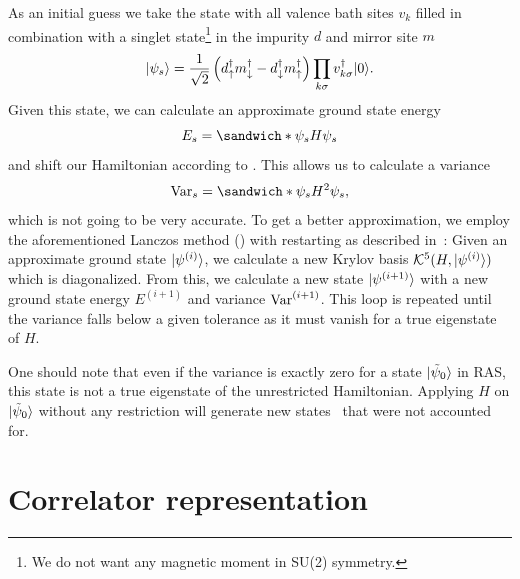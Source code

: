 As an initial guess we take the state with all valence bath sites $v_k$ filled in combination with
a singlet state\footnote{
    We do not want any magnetic moment in SU(2) symmetry. %
}
in the impurity $d$ and mirror site $m$
\begin{equation}
    \ket*{\psi_s}
    =
    \frac{1}{\sqrt{2}}
    \left(d^\dag_\uparrow m^\dag_\downarrow - d^\dag_\downarrow m^\dag_\uparrow\right)
    \prod_{k\sigma} v^\dag_{k\sigma}
    \ket{0}.
\end{equation}
Given this state, we can calculate an approximate ground state energy
\begin{equation}
    E_s = \sandwich*{\psi_s}{H}{\psi_s}
\end{equation}
and shift our Hamiltonian according to .
This allows us to calculate a variance
\begin{equation}
    \var_s
    =
    \sandwich*{\psi_s}{H^2}{\psi_s},
\end{equation}
which is not going to be very accurate.
To get a better approximation,
we employ the aforementioned Lanczos method () with restarting
as described in~\cite{Lu2014}:
Given an approximate ground state $\ket{\psi^{(i)}}$,
we calculate a new Krylov basis $\mathcal{K}^5(H, \ket{\psi^{(i)}})$ which is diagonalized.
From this, we calculate a new state $\ket{\psi^{(i+1)}}$
with a new ground state energy $E^{(i+1)}$
and variance $\var^{(i+1)}$.
This loop is repeated until the variance falls below a given tolerance
as it must vanish for a true eigenstate of $H$.

One should note that even if the variance is exactly zero for a state $\ket{\tilde\psi_0}$
in RAS,
this state is not a true eigenstate of the unrestricted Hamiltonian.
Applying $H$ on $\ket{\tilde\psi_0}$ without any restriction
will generate new states~\cite{Lu2014} that were not accounted for.

\section{Correlator representation}

